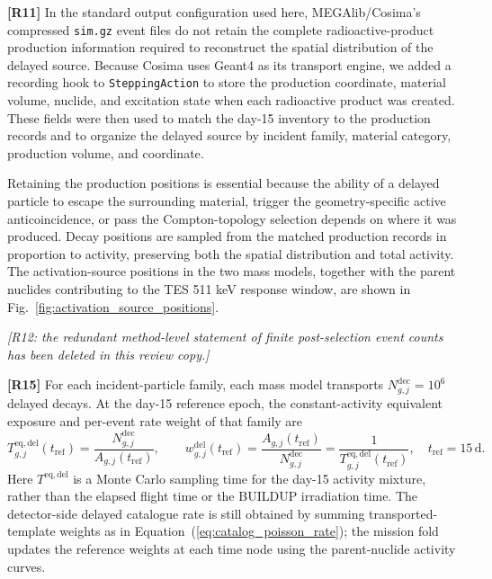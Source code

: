 \documentclass[11pt]{article}
\newcommand{\revdeleted}[1]{\par\noindent\textcolor{revisionblue}{\small\itshape [#1]}\par}
\begin{document}
\begingroup
\color{revisionblue}
\noindent\textbf{[R11]} In the standard output configuration used here,
MEGAlib/Cosima's compressed \texttt{sim.gz} event files do not retain the
complete radioactive-product production information required to reconstruct
the spatial distribution of the delayed source. Because Cosima uses Geant4 as
its transport engine, we added a recording hook to \texttt{SteppingAction} to
store the production coordinate, material volume, nuclide, and excitation
state when each radioactive product was created. These fields were then used
to match the day-15 inventory to the production records and to organize the
delayed source by incident family, material category, production volume, and
coordinate.

Retaining the production positions is essential because the ability of a
delayed particle to escape the surrounding material, trigger the
geometry-specific active anticoincidence, or pass the Compton-topology
selection depends on where it was produced. Decay positions are sampled from
the matched production records in proportion to activity, preserving both the
spatial distribution and total activity. The activation-source positions in
the two mass models, together with the parent nuclides contributing to the TES
511 keV response window, are shown in
Fig.~\ref{fig:activation_source_positions}.
\endgroup

\revdeleted{R12: the redundant method-level statement of finite post-selection event counts has been deleted in this review copy.}

\begingroup
\color{revisionblue}
\noindent\textbf{[R15]} For each incident-particle family, each mass model
transports $N^{\mathrm{dec}}_{g,j}=10^6$ delayed decays. At the day-15 reference
epoch, the constant-activity equivalent exposure and per-event rate weight of
that family are
\begin{equation}
 T^{\mathrm{eq,del}}_{g,j}(t_{\mathrm{ref}})
 =\frac{N^{\mathrm{dec}}_{g,j}}{A_{g,j}(t_{\mathrm{ref}})},
 \qquad
 w^{\mathrm{del}}_{g,j}(t_{\mathrm{ref}})
 =\frac{A_{g,j}(t_{\mathrm{ref}})}{N^{\mathrm{dec}}_{g,j}}
 =\frac{1}{T^{\mathrm{eq,del}}_{g,j}(t_{\mathrm{ref}})},
 \quad t_{\mathrm{ref}}=15\,\mathrm{d}.
 \label{eq:delayed_equivalent_exposure}
\end{equation}
Here $T^{\mathrm{eq,del}}$ is a Monte Carlo sampling time for the day-15
activity mixture, rather than the elapsed flight time or the BUILDUP
irradiation time. The detector-side delayed catalogue rate is still obtained
by summing transported-template weights as in
Equation~(\ref{eq:catalog_poisson_rate}); the mission fold updates the
reference weights at each time node using the parent-nuclide activity curves.
\endgroup
\end{document}
